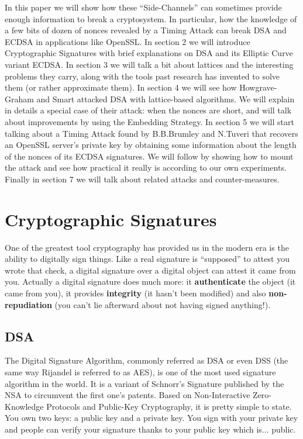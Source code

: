 \documentclass[a4paper,11pt]{article}
\begin{document}
In this paper we will show how these ``Side-Channels'' can sometimes provide enough information to break a cryptosystem. In particular, how the knowledge of a few bits of dozen of nonces revealed by a Timing Attack can break DSA and ECDSA in applications like OpenSSL. In section 2 we will introduce Cryptographic Signatures with brief explanations on DSA and its Elliptic Curve variant ECDSA. In section 3 we will talk a bit about lattices and the interesting problems they carry, along with the tools past research has invented to solve them (or rather approximate them). In section 4 we will see how Howgrave-Graham and Smart attacked DSA with lattice-based algorithms. We will explain in details a special case of their attack: when the nonces are short, and will talk about improvements by using the Embedding Strategy. In section 5 we will start talking about a Timing Attack found by B.B.Brumley and N.Tuveri that recovers an OpenSSL server's private key by obtaining some information about the length of the nonces of its ECDSA signatures. We will follow by showing how to mount the attack and see how practical it really is according to our own experiments. Finally in section 7 we will talk about related attacks and counter-measures.

\section{Cryptographic Signatures}\label{rsa}


One of the greatest tool cryptography has provided us in the modern era is the ability to digitally sign things. Like a real signature is ``supposed'' to attest you wrote that check, a digital signature over a digital object can attest it came from you. Actually a digital signature does much more: it \textbf{authenticate} the object (it came from you), it provides \textbf{integrity} (it hasn't been modified) and also \textbf{non-repudiation} (you can't lie afterward about not having signed anything!).

\subsection{DSA}\label{dsa}

The Digital Signature Algorithm, commonly referred as DSA or even DSS (the same way Rijandel is referred to as AES), is one of the most used signature algorithm in the world. It is a variant of Schnorr's Signature\cite{schnorr} published by the NSA to circumvent the first one's patents. Based on Non-Interactive Zero-Knowledge Protocols and Public-Key Cryptography, it is pretty simple to state. You own two keys: a public key and a private key. You sign with your private key and people can verify your signature thanks to your public key which is... public.
\end{document}
